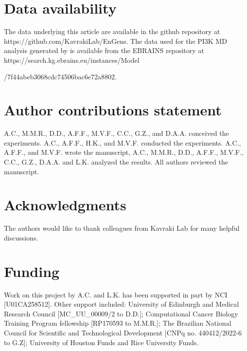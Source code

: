 \documentclass[unnumsec,webpdf,contemporary,large,numsquare]{oup-authoring-template}%
\theoremstyle{thmstyleone}%
\theoremstyle{thmstyletwo}%
\theoremstyle{thmstylethree}%
\begin{document}
\section{Data availability}
The data underlying this article are available in the github repository at https://github.com/KavrakiLab/EnGens.
The data used for the PI3K MD analysis generated by \citep{galdadas_unravelling_2020} is available from the EBRAINS repository at https://search.kg.ebrains.eu/instances/Model

/7f44abeb3068cdc74506bac6e72a8802.

\section{Author contributions statement}
A.C., M.M.R., D.D., A.F.F., M.V.F., C.C., G.Z., and D.A.A. conceived the experiments. A.C., A.F.F., H.K., and M.V.F. conducted the experiments. A.C., A.F.F., and M.V.F. wrote the manuscript, A.C., M.M.R., D.D., A.F.F., M.V.F., C.C., G.Z., D.A.A. and L.K. analyzed the results. All authors reviewed the manuscript.

\section{Acknowledgments}
The authors would like to thank colleagues from Kavraki Lab for many helpful discussions. 

\section{Funding}
Work on this project by A.C. and L.K. has been supported in part by NCI [U01CA258512]. Other support included: University of Edinburgh and Medical Research Council [MC\_UU\_00009/2 to D.D.]; Computational Cancer Biology Training Program fellowship [RP170593 to M.M.R.]; The Brazilian National Council for Scientific and Technological Development [CNPq no. 440412/2022-6 to G.Z]; University of Houston Funds and Rice University Funds.

%
%


\typeout{}

\newpage
\end{document}
